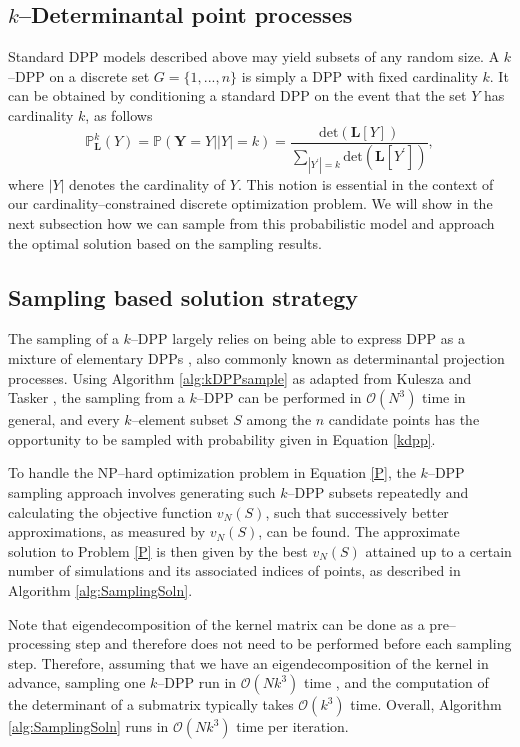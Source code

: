 \documentclass[]{interact}
\theoremstyle{plain}%
\theoremstyle{definition}
\theoremstyle{remark}
\newcommand{\matr}[1]{\bm{#1}}
\begin{document}
\subsection{$k$--Determinantal point processes}
Standard DPP models described above may yield subsets of any random size. A $k$--DPP on a discrete set $G = \{1, ..., n\}$ is simply a DPP with fixed cardinality $k$. It can be obtained by conditioning a standard DPP on the event that the set $Y$ has cardinality $k$, as follows
\begin{equation}\label{kdpp}
	\mathbb{P}_{\matr{L}}^k (Y) = \mathbb{P}(\mathbf{Y}=Y | |Y|=k) = \frac{\text{det}(\matr{L}[Y])}{\sum_{|Y^{\prime}|=k} \text{det}(\matr{L}[Y^{\prime}])},
\end{equation} where $|Y|$ denotes the cardinality of $Y$. This notion is essential in the context of our cardinality--constrained discrete optimization problem. We will show in the next subsection how we can sample from this probabilistic model and approach the optimal solution based on the sampling results.

\subsection{Sampling based solution strategy}
The sampling of a $k$--DPP largely relies on being able to express DPP as a mixture of elementary DPPs \cite{Kulesza and Taskar}, also commonly known as determinantal projection processes. Using Algorithm \ref{alg:kDPPsample} as adapted from Kulesza and Tasker \cite{Kulesza and Taskar}, the sampling from a $k$--DPP can be performed in $\mathcal{O}(N^3)$ time in general, and every $k$--element subset $S$ among the $n$ candidate points has the opportunity to be sampled with probability given in Equation \eqref{kdpp}.

To handle the NP--hard optimization problem in Equation \eqref{P}, the $k$--DPP sampling approach involves generating such $k$--DPP subsets repeatedly and calculating the objective function $v_{N} (S)$, such that successively better approximations, as measured by $v_{N} (S)$, can be found. The approximate solution to Problem \ref{P} is then given by the best $v_{N} (S)$ attained up to a certain number of simulations and its associated indices of points, as described in Algorithm \ref{alg:SamplingSoln}. 

Note that eigendecomposition of the kernel matrix can be done as a pre--processing step and therefore does not need to be performed before each sampling step. Therefore, assuming that we have an eigendecomposition of the kernel in advance, sampling one $k$--DPP run in $\mathcal{O}(Nk^3)$ time \cite{Kulesza and Taskar}, and the computation of the determinant of a submatrix typically takes $\mathcal{O}(k^3)$ time. Overall, Algorithm \ref{alg:SamplingSoln} runs in $\mathcal{O}(Nk^3)$ time per iteration.  
\end{document}
